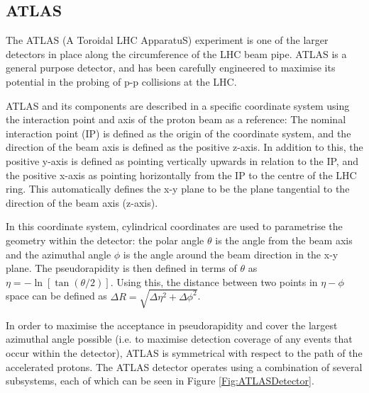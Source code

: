 \documentclass[12pt,a4paper,epsf,portrait,times,epsfig]{article}
\begin{document}
		\subsection{ATLAS}
		
		The ATLAS (A Toroidal LHC ApparatuS) experiment \cite{ATLAS-TDR-01, ATLAS-TDR-02, Article:ATLASDesignPaper} is one of the larger detectors in place along the circumference of the LHC beam pipe. ATLAS is a general purpose detector, and has been carefully engineered to maximise its potential in the probing of p-p collisions at the LHC. \par
		
		ATLAS and its components are described in a specific coordinate system using the interaction point and axis of the proton beam as a reference: The nominal interaction point (IP) is defined as the origin of the coordinate system, and the direction of the beam axis is defined as the positive z-axis. In addition to this, the positive y-axis is defined	as pointing vertically upwards in relation to the IP, and the positive x-axis as pointing	horizontally from the IP to the centre of the LHC ring. This automatically defines the x-y plane to be the plane tangential to the direction of the beam axis (z-axis). \par
		
		In this coordinate system, cylindrical coordinates are used to parametrise the geometry within the detector: the polar angle $\theta$  is the angle from the beam axis and the azimuthal angle $\phi$ is the angle around the beam direction in the x-y plane. The pseudorapidity is then defined in terms of $\theta$ as $\eta = - \ln[\tan(\theta/2)]$. Using this, the distance between two points in $\eta-\phi$ space can be defined as $\Delta R =	\sqrt{\Delta\eta^{2}+\Delta\phi^{2}}$. \par
		
		In order to maximise the acceptance in pseudorapidity and cover the largest azimuthal angle possible (i.e. to maximise detection coverage of any events that occur within the detector), ATLAS is symmetrical with respect to the path of the accelerated protons. The	ATLAS detector operates using a combination of several subsystems, each of which can
		be seen in Figure \ref{Fig:ATLASDetector}. \par
		
\end{document}
